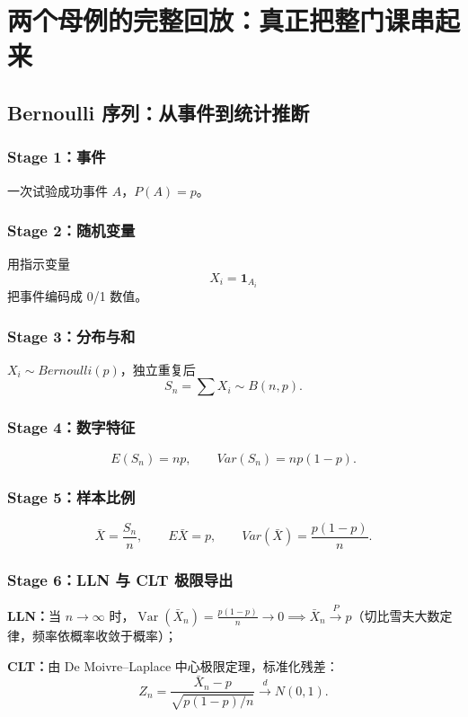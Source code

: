 \documentclass[11pt,a4paper,openany]{ctexbook}
\newcommand{\key}[1]{\textbf{\color{deep}#1}}
\begin{document}
\chapter{两个母例的完整回放：真正把整门课串起来}

\section{Bernoulli 序列：从事件到统计推断}
\subsection{Stage 1：事件}
一次试验成功事件 $A$，$P(A)=p$。

\subsection{Stage 2：随机变量}
用指示变量
\[
X_i=\mathbf 1_{A_i}
\]
把事件编码成 0/1 数值。

\subsection{Stage 3：分布与和}
$X_i\sim Bernoulli(p)$，独立重复后
\[
S_n=\sum X_i\sim B(n,p).
\]

\subsection{Stage 4：数字特征}
\[
E(S_n)=np,\qquad Var(S_n)=np(1-p).
\]

\subsection{Stage 5：样本比例}
\[
\bar X=\frac{S_n}{n},\qquad E\bar X=p,\qquad Var(\bar X)=\frac{p(1-p)}{n}.
\]

\subsection{Stage 6：LLN 与 CLT 极限导出}
\key{LLN：}当 $n \to \infty$ 时，$\operatorname{Var}(\bar X_n) = \frac{p(1-p)}{n} \to 0 \implies \bar X_n \xrightarrow{P} p$（切比雪夫大数定律，频率依概率收敛于概率）；

\key{CLT：}由 De Moivre--Laplace 中心极限定理，标准化残差：
\[
Z_n = \frac{\bar X_n - p}{\sqrt{p(1-p)/n}} \xrightarrow{d} N(0,1).
\]
\end{document}
